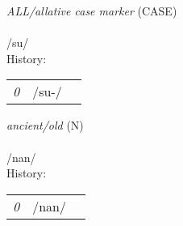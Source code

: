 \vspace{15pt}
\begin{nopagebreak}
 \textit{ALL/allative case marker} (CASE)\\
\\
\noindent /s{\textprimstress}u/\\


\noindent History:

\vspace{-0pt}
\hspace{40pt}
\begin{tabular}{ccc}
\textit{0} & /su-/& \\
\end{tabular}

\vspace{20pt}\hline

\end{nopagebreak}
\filbreak



\vspace{15pt}
\begin{nopagebreak}
 \textit{ancient/old} (N)\\
\\
\noindent /n{\textprimstress}an/\\


\noindent History:

\vspace{-0pt}
\hspace{40pt}
\begin{tabular}{ccc}
\textit{0} & /nan/& \\
\end{tabular}

\vspace{20pt}\hline

\end{nopagebreak}
\filbreak



